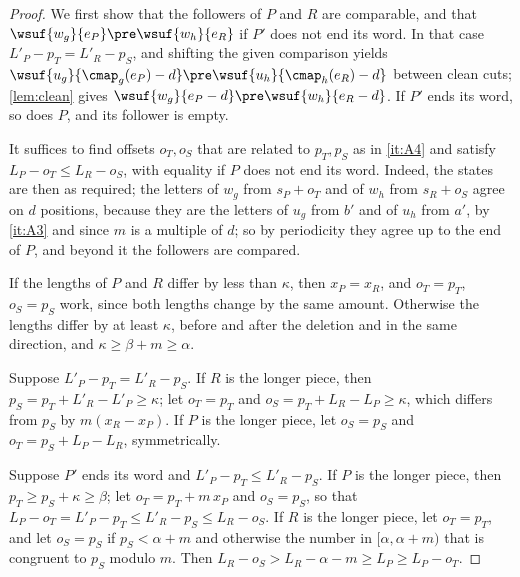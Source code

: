 \begin{proof}
We first show that the followers of $P$ and $R$ are comparable, and that
$\wsuf{w_g}{e_P}\pre\wsuf{w_h}{e_R}$ if $P'$ does not end its word. In that
case $L'_P-p_T=L'_R-p_S$, and shifting the given comparison yields
$\wsuf{u_g}{\cmap_g(e_P)-d}\pre\wsuf{u_h}{\cmap_h(e_R)-d}$ between clean
cuts; \cref{lem:clean} gives $\wsuf{w_g}{e_P-d}\pre\wsuf{w_h}{e_R-d}$. If
$P'$ ends its word, so does $P$, and its follower is empty.

It suffices to find offsets $o_T,o_S$ that are related to $p_T,p_S$ as in
\ref{it:A4} and satisfy $L_P-o_T\le L_R-o_S$, with equality if $P$ does not
end its word. Indeed, the states are then as required; the letters of
$w_g$ from $s_P+o_T$ and of $w_h$ from $s_R+o_S$ agree on $d$ positions,
because they are the letters of $u_g$ from $b'$ and of $u_h$ from $a'$, by
\ref{it:A3} and since $m$ is a multiple of $d$; so by periodicity they
agree up to the end of $P$, and beyond it the followers are compared.

If the lengths of $P$ and $R$ differ by less than $\kappa$, then
$x_P=x_R$, and $o_T=p_T$, $o_S=p_S$ work, since both lengths change by the
same amount. Otherwise the lengths differ by at least $\kappa$, before and
after the deletion and in the same direction, and $\kappa\ge\beta+m\ge
\alpha$.

Suppose $L'_P-p_T=L'_R-p_S$. If $R$ is the longer piece, then
$p_S=p_T+L'_R-L'_P\ge\kappa$; let $o_T=p_T$ and $o_S=p_T+L_R-L_P\ge\kappa$,
which differs from $p_S$ by $m(x_R-x_P)$. If $P$ is the longer piece, let
$o_S=p_S$ and $o_T=p_S+L_P-L_R$, symmetrically.

Suppose $P'$ ends its word and $L'_P-p_T\le L'_R-p_S$. If $P$ is the longer
piece, then $p_T\ge p_S+\kappa\ge\beta$; let $o_T=p_T+m\,x_P$ and
$o_S=p_S$, so that $L_P-o_T=L'_P-p_T\le L'_R-p_S\le L_R-o_S$. If $R$ is the
longer piece, let $o_T=p_T$, and let $o_S=p_S$ if $p_S<\alpha+m$ and
otherwise the number in $[\alpha,\alpha+m)$ that is congruent to $p_S$
modulo $m$. Then $L_R-o_S>L_R-\alpha-m\ge L_P\ge L_P-o_T$.
\end{proof}

